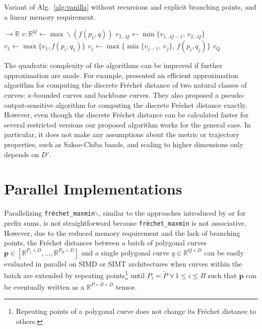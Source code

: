 \begin{algorithm}
    \caption{Variant of Alg.~\ref{alg:vanilla} without recursions and explicit branching points, and a linear memory requirement.}
    \label{alg:linear}
    \begin{algorithmic}[1]
         $\to \mathbb{R}$
            \State $v: \mathbb{R}^Q \gets \max\!\backslash(f(p_1, q))$
            \Statex
                \State $v_{2 \ldots Q} \gets \min\{ v_{1 \ldots Q-1},\, v_{2 \ldots Q} \}$
                \Statex
                \State $v_1 \gets \max\{ v_1, f(p_i, q_1) \}$
                    \State $v_j \gets \max\{ \min\{ v_{j-1},\, v_j \},\, f(p_i, q_j) \}$ 
                \EndFor
            \EndFor
            \Statex
            \State \Return $v_Q$
        \EndFunction
    \end{algorithmic}
\end{algorithm}

The quadratic complexity of the algorithms can be improved if further approximation are made.
For example, \citet{aronov06} presented an efficient approximation algorithm for computing the discrete Fr\'echet distance of two natural classes of curves: $\kappa$-bounded curves and backbone curves.
They also proposed a pseudo-output-sensitive algorithm for computing the discrete Fr\'echet distance exactly.
However, even though the discrete Fr\'echet distance can be calculated faster for several restricted versions \citep{driemel12,gudmundsson18,buchin10,maheshwari11} our proposed algorithm works for the general case.
In particular, it does not make any assumptions about the metric or trajectory properties, such as Sakoe-Chiba bands, and scaling to higher dimensions only depends on $D'$.

\section{Parallel Implementations}
\label{sec:parallel}
Parallelizing \texttt{fr\'echet\_maxmin}$\backslash$, similar to the approaches introduced by \citet{kogge73} or \citet{brent82} for prefix sums, is not straightforward because \texttt{fr\'echet\_maxmin} is not associative.
However, due to the reduced memory requirement and the lack of branching points, the Fr\'echet distances between a batch of polygonal curves $\boldsymbol{p} \in [\mathbb{R}^{P_1 \times D}, \ldots, \mathbb{R}^{P_B \times D}]$ and a single polygonal curve $q \in \mathbb{R}^{Q \times D}$ can be easily evaluated in parallel on SIMD or SIMT architectures when curves within the batch are extended by repeating points\footnote{Repeating points of a polygonal curve does not change its Fr\'echet distance to others.} until $P_i = \tilde P \; \forall\, 1 \le i \le B$ such that $\boldsymbol{p}$ can be eventually written as a $\mathbb{R}^{\tilde P \times B \times D}$ tensor.

